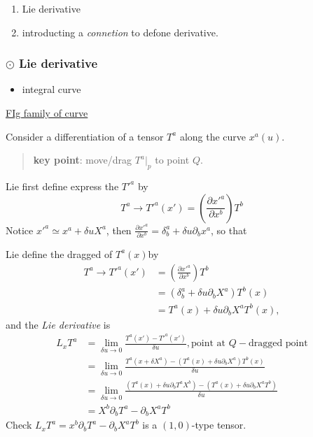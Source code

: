 \begin{enumerate}
	\item Lie derivative
	\item introducting a \textit{connetion} to defone derivative.

\end{enumerate}
\subsubsection{$\odot$ Lie derivative} %

\begin{itemize}
	\item integral curve

\end{itemize}
    \underline{FIg family of curve}

Consider a differentiation of a tensor $T^{a}$ along the curve $x^{a}(u)$.

\begin{quote}
	\textbf{key point}: move/drag $T^{a}\bigg|_{p}$ to point $Q$.
\end{quote}

Lie first define express the $T'^{a}$ by
\begin{equation}
T^{a}\to T'^{a}(x') = \left(\frac{\partial x'^{a}}{\partial x^{b}}\right) T^{b}
\end{equation}
Notice $x'^{a}\simeq x^{a} + \delta u X^{a}$, then $\displaystyle \frac{\partial x'^{a}}{\partial x^{b}} = \delta^{a}_{b} + \delta u \partial_{b} x^{a}$, so that

Lie define the dragged of $T^{a}(x)$​ by
\begin{equation}
\begin{aligned}
T^{a}\to T'^{a}(x') &= \left(\frac{\partial x'^{a}}{\partial x^{b}}\right) T^{b}\\
&= \left(\delta^{a}_{b} + \delta u \partial_b X^{a}\right)T^{b}(x)\\
&= T^{a}(x) + \delta u \partial_b X^{a}T^{b}(x),
\end{aligned}
\end{equation}
and the \textit{Lie derivative} is
\begin{equation}
\begin{aligned}
L_{x} T^{a}
&= \lim_{\delta u \to 0} \frac{T^{a}(x') - T'^{a}(x')}{\delta u},\text{point at $Q-$dragged point}\\
&= \lim_{\delta u \to 0} \frac{T^{a}(x+\delta X^{a}) - \left(T^{a}(x)+\delta u \partial_{b}X^{a}\right) T^{b}(x)}{\delta u}\\
&= \lim_{\delta u\to 0} \frac{\left(T^{a}(x) + \delta u \partial_{b}T^{a}X^{b}\right) - \left(T^{a}(x)+\delta u \partial_{b} X^{a} T^{b}\right)}{\delta u}\\
&= X^{b}\partial_{b}T^{a} - \partial_{b}X^{a}T^{b}
\end{aligned}
\end{equation}
Check $L_{x} T^{a} = x^{b}\partial_{b}T^{a} - \partial_{b}X^{a}T^{b}$ is a $(1,0)$-type tensor. 

